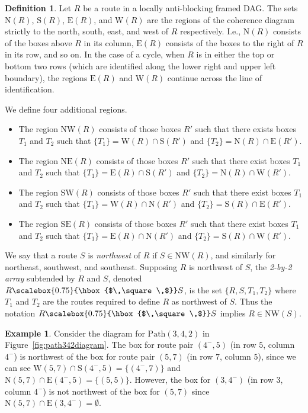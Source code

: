 \documentclass[12pt]{amsart}
\theoremstyle{definition}
\newtheorem{definition}[theorem]{Definition}
\newtheorem{example}[theorem]{Example}
\newcommand{\defn}[1]{\emph{\color{blue} #1}}
\newcommand\Path{\mathrm{Path}}
\newcommand\north{\mathrm{N}}
\newcommand\south{\mathrm{S}}
\newcommand\east{\mathrm{E}}
\newcommand\west{\mathrm{W}}
\newcommand\NW{\mathrm{NW}}
\newcommand\NE{\mathrm{NE}}
\newcommand\SW{\mathrm{SW}}
\newcommand\SE{\mathrm{SE}}
\newcommand\squarette{\scalebox{0.75}{\hbox{$\,\square\,$}}}
\begin{document}
\begin{definition}\label{def:diagramregions}
    Let $R$ be a route in a locally anti-blocking framed DAG.
    The sets $\north(R)$, $\south(R)$, $\east(R)$, and $\west(R)$ are the regions of the coherence diagram strictly to the north, south, east, and west of $R$ respectively. I.e., $\north(R)$ consists of the boxes above $R$ in its column, $\east(R)$ consists of the boxes to the right of $R$ in its row, and so on.
    In the case of a cycle, when $R$ is in either the top or bottom two rows (which are identified along the lower right and upper left boundary), the regions $\east(R)$ and $\west(R)$ continue across the line of identification.

    We define four additional regions.      \begin{itemize}
            \item The region $\NW(R)$ consists of those boxes $R'$ such that there exists boxes $T_1$ and $T_2$ such that $\{T_1\}=\west(R) \cap \south(R')$ and $\{T_2\}=\north(R) \cap \east(R')$.
            \item The region $\NE(R)$ consists of those boxes $R'$ such that there exist boxes $T_1$ and $T_2$ such that $\{T_1\}=\east(R) \cap \south(R')$ and $\{T_2\}=\north(R) \cap \west(R')$.
            \item The region $\SW(R)$ consists of those boxes $R'$ such that there exist boxes $T_1$ and $T_2$ such that $\{T_1\}=\west(R) \cap \north(R')$ and $\{T_2\}=\south(R) \cap \east(R')$.
            \item The region $\SE(R)$ consists of those boxes $R'$ such that there exist boxes $T_1$ and $T_2$ such that $\{T_1\}=\east(R) \cap \north(R')$ and $\{T_2\}=\south(R) \cap \west(R')$.
        \end{itemize}
    We say that a route $S$ is \defn{northwest} of $R$ if $S\in \NW(R)$, and similarly for northeast, southwest, and southeast.
    Supposing $R$ is northwest of $S$, the \defn{2-by-2 array} subtended by $R$ and $S$, denoted $R\squarette S$, is the set $\{R, S, T_1, T_2\}$ where $T_1$ and $T_2$ are the routes required to define $R$ as northwest of $S$. Thus the notation $R\squarette  S$ implies $R\in \NW(S)$.
\end{definition}

\begin{example}
    Consider the diagram for $\Path(3,4,2)$ in Figure~\ref{fig:path342diagram}.
    The box for route pair $(4^-,5)$ (in row $5$, column $4^-$) is northwest of the box for route pair $(5,7)$ (in row $7$, column $5$), since we can see $\west(5,7)\cap \south(4^-,5)=\{(4^-,7)\}$ and $\north(5,7)\cap \east(4^-,5)=\{(5,5)\}$.
    However, the box for $(3,4^-)$ (in row $3$, column $4^-$) is not northwest of the box for $(5,7)$ since $\north(5,7)\cap \east(3,4^-)=\emptyset$.
\end{example}
\end{document}
